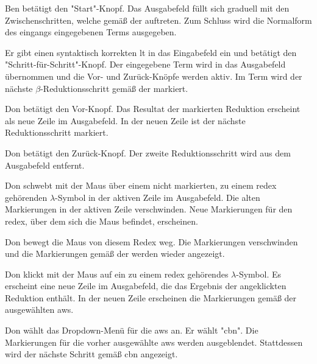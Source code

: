\documentclass[parskip=full,11pt,twoside]{scrartcl}
\begin{document}
{Ben betätigt den "Start"-Knopf.}
{Das Ausgabefeld füllt sich graduell mit den Zwischenschritten, welche gemäß der  auftreten.
Zum Schluss wird die Normalform des eingangs eingegebenen Terms ausgegeben.}


{Er gibt einen syntaktisch korrekten \gls{lt} in das Eingabefeld ein und betätigt
den "Schritt-für-Schritt"-Knopf.}
{Der eingegebene Term wird in das Ausgabefeld übernommen und die Vor- und
Zurück-Knöpfe werden aktiv. Im Term wird der nächste $\beta$-Reduktionsschritt
gemäß der  markiert.}

{Don betätigt den Vor-Knopf.}
{Das Resultat der markierten Reduktion erscheint als neue Zeile im Ausgabefeld.
In der neuen Zeile ist der nächste Reduktionsschritt markiert.}

{Don betätigt den Zurück-Knopf.}
{Der zweite Reduktionsschritt wird aus dem Ausgabefeld entfernt.}

{Don schwebt mit der Maus über einem nicht markierten, zu einem \gls{redex} gehörenden
$\lambda$-Symbol in der aktiven Zeile im Ausgabefeld.}
{Die alten Markierungen in der aktiven Zeile verschwinden. Neue Markierungen für den \gls{redex}, über dem
sich die Maus befindet, erscheinen.}

{Don bewegt die Maus von diesem Redex weg.}
{Die Markierungen verschwinden und die Markierungen gemäß der 
werden wieder angezeigt.}

{Don klickt mit der Maus auf ein zu einem \gls{redex} gehörendes $\lambda$-Symbol.}
{Es erscheint eine neue Zeile im Ausgabefeld, die das Ergebnis der angeklickten
Reduktion enthält. In der neuen Zeile erscheinen die Markierungen gemäß der ausgewählten
\gls{aws}.}

{Don wählt das Dropdown-Menü für die \gls{aws} an. Er wählt "\gls{cbn}".}
{Die Markierungen für die vorher ausgewählte \gls{aws} werden ausgeblendet.
Stattdessen wird der nächste Schritt gemäß \gls{cbn} angezeigt.}
\end{document}
